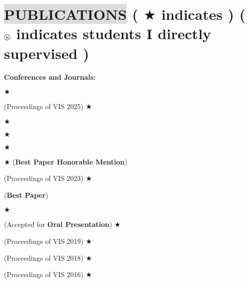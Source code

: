 \section*{
    \colorbox{gainsboro}{PUBLICATIONS}  {\small \normalfont ( \footnotesize $\bigstar$ \small indicates  ) ( $\circledS$ indicates students I directly supervised )}
}
    

\textbf{Conferences and Journals:}
\vspace{-3mm}
\begin{etaremune}[leftmargin=7mm]
    \item {} \footnotesize $\bigstar$ \small
    \item {} (Proceedings of VIS 2025) \footnotesize $\bigstar$ \small
    \item {} \footnotesize $\bigstar$ \small
    \item {}
    \item {} \footnotesize $\bigstar$ \small
    \item {} \footnotesize $\bigstar$ \small
    \item {} \footnotesize $\bigstar$ \small (\textbf{Best Paper Honorable Mention})
    \item {} (Proceedings of VIS 2023) \footnotesize $\bigstar$ \small
    \item {}
    \item {}
    \item {} (\textbf{Best Paper})
    \item {}
    \item {} \footnotesize $\bigstar$ \small
    \item {} (Accepted for \textbf{Oral Presentation}) \footnotesize $\bigstar$ \small
    \item {} (Proceedings of VIS 2019) \footnotesize $\bigstar$ \small
    \item {} (Proceedings of VIS 2018) \footnotesize $\bigstar$ \small
    \item {} (Proceedings of VIS 2016) \footnotesize $\bigstar$ \small
    \item {}
\end{etaremune}


